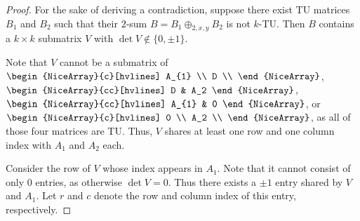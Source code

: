 \documentclass{article}
\theoremstyle{definition}
\begin{document}
\begin{proof}
    For the sake of deriving a contradiction, suppose there exist TU matrices $B_{1}$ and $B_{2}$ such that their $2$-sum $B = B_{1} \oplus_{2, x, y} B_{2}$ is not $k$-TU. Then $B$ contains a $k \times k$ submatrix $V$ with $\det V \notin \{0, \pm 1\}$.

    Note that $V$ cannot be a submatrix of $\begin{NiceArray}{c}[hvlines] A_{1} \\ D \\ \end{NiceArray}$, $\begin{NiceArray}{cc}[hvlines] D & A_2 \end{NiceArray}$, $\begin{NiceArray}{cc}[hvlines] A_{1} & 0 \end{NiceArray}$, or  $\begin{NiceArray}{c}[hvlines] 0 \\ A_2 \\ \end{NiceArray}$, as all of those four matrices are TU. Thus, $V$ shares at least one row and one column index with $A_{1}$ and $A_{2}$ each.

    Consider the row of $V$ whose index appears in $A_{1}$. Note that it cannot consist of only $0$ entries, as otherwise $\det V = 0$. Thus there exists a $\pm 1$ entry shared by $V$ and $A_{1}$. Let $r$ and $c$ denote the row and column index of this entry, respectively.


\end{proof}
\end{document}
